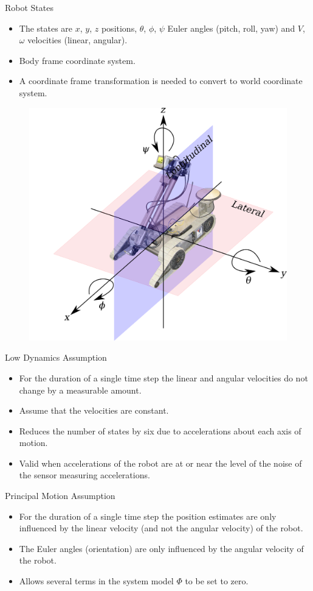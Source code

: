 \documentclass[hyperref={pdfpagelabels=false}]{beamer}
\begin{document}
\begin{frame}{Robot States}
\begin{itemize}
\item The states are $x$, $y$, $z$ positions, $\theta$, $\phi$, $\psi$ Euler angles (pitch, roll, yaw) and $V$, $\omega$ velocities (linear, angular).
\item Body frame coordinate system.
\item A coordinate frame transformation is needed to convert to world coordinate system.
\end{itemize}
\begin{figure}[ht!]
    \centering
    \includegraphics[width=.5\textwidth]{images/packbotaxes}
\end{figure}
\end{frame}

\begin{frame}{Low Dynamics Assumption}
\begin{itemize}
\item For the duration of a single time step the linear and angular velocities do not change by a measurable amount.
\item Assume that the velocities are constant.
\item Reduces the number of states by six due to accelerations about each axis of motion.
\item Valid when accelerations of the robot are at or near the level of the noise of the sensor measuring accelerations.
\end{itemize}
\end{frame}

\begin{frame}{Principal Motion Assumption}
\begin{itemize}
\item For the duration of a single time step the position estimates are only influenced by the linear velocity (and not the angular velocity) of the robot.
\item The Euler angles (orientation) are only influenced by the angular velocity of the robot.
\item Allows several terms in the system model $\Phi$ to be set to zero.
\end{itemize}
\end{frame}
\end{document}
